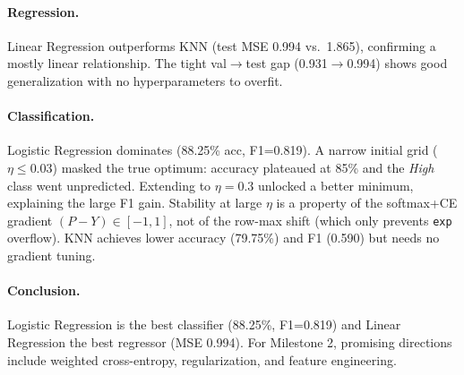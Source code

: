 \documentclass[10pt, twocolumn, letterpaper]{article}
\begin{document}
\paragraph{Regression.}
Linear Regression outperforms KNN (test MSE 0.994 vs.\ 1.865), confirming a mostly linear relationship. The tight val$\to$test gap (0.931$\to$0.994) shows good generalization with no hyperparameters to overfit.

\paragraph{Classification.}
Logistic Regression dominates (88.25\% acc, F1=0.819). A narrow initial grid ($\eta\leq0.03$) masked the true optimum: accuracy plateaued at 85\% and the \emph{High} class went unpredicted. Extending to $\eta{=}0.3$ unlocked a better minimum, explaining the large F1 gain. Stability at large $\eta$ is a property of the softmax+CE gradient $(P-Y)\in[-1,1]$, not of the row-max shift (which only prevents \texttt{exp} overflow). KNN achieves lower accuracy (79.75\%) and F1 (0.590) but needs no gradient tuning.

\paragraph{Conclusion.}
Logistic Regression is the best classifier (88.25\%, F1=0.819) and Linear Regression the best regressor (MSE 0.994). For Milestone 2, promising directions include weighted cross-entropy, regularization, and feature engineering.
\end{document}
